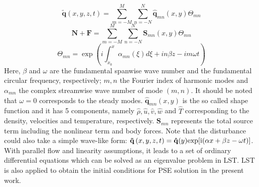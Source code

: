 \documentclass{AIAA}
\begin{document}
\begin{equation}
\label{e:Fourier1}
    {\mathbf{\tilde q}}\left( {x,y,z,t} \right) = \sum\limits_{m =  - M}^M {\sum\limits_{n =  - N}^N {{\mathbf{\hat q}}_{mn} \left( {x,y} \right)\Theta _{mn} } }
\end{equation}
\begin{equation}
\label{e:Fourier2}
    {\mathbf{N}} + {\mathbf{F}} = \sum\limits_{m =  - M}^M {\sum\limits_{n =  - N}^N {{\mathbf{S}}_{mn} \left( {x,y} \right)\Theta _{mn} } }
\end{equation}
\begin{equation}
\label{e:Fourier3}
    \Theta _{mn}  = \exp \left( {i\int_{x_0 }^x {\alpha _{mn} \left( \xi  \right)d\xi }  + in\beta z - im\omega t} \right)
\end{equation}
Here, $\beta$ and $\omega$ are the fundamental spanwise wave number and the fundamental circular frequency, respectively; $m,n$  the Fourier index of harmonic modes and $\alpha_{mn}$  the complex streamwise wave number of mode $(m,n)$. It should be noted that $\omega=0$ corresponds to the steady modes. $\mathbf{\hat q}_{mn} \left( {x,y} \right)$ is the so called shape function and it has 5 components, namely $\hat\rho, \hat u, \hat v, \hat w$ and $\hat T$ corresponding to the density, velocities and temperature, respectively. $\mathbf{S}_{mn}$ represents the total source term including the nonlinear term and  body forces. Note that the disturbance could also take a simple wave-like form: ${\mathbf{\tilde q}}\left( {x,y,z,t} \right) = \mathbf{\hat q}(y){\rm exp} [{\rm i}(\alpha x+\beta z -\omega t)]$. With parallel flow  and linearity assumptions, it leads to a set of ordinary differential equations which can be solved as an eigenvalue problem in LST\cite{Mack1984}. LST is also applied to obtain the initial conditions for PSE solution in the present work.
\end{document}
